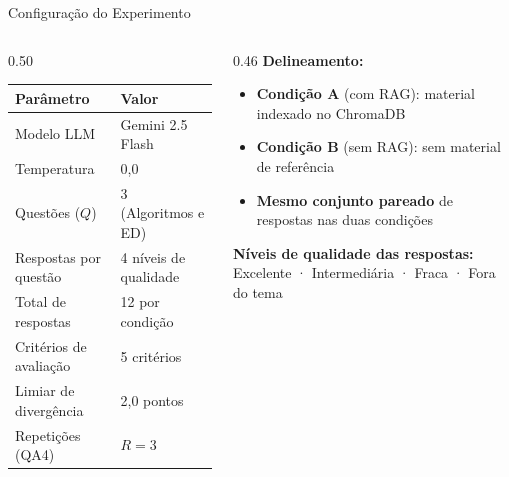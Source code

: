 \documentclass[10pt,aspectratio=169]{beamer}
\begin{document}
\begin{frame}{Configuração do Experimento}
  \begin{columns}[T]
    \begin{column}{0.50\textwidth}
      \begin{tabular}{ll}
        \toprule
        \textbf{Parâmetro} & \textbf{Valor} \\
        \midrule
        Modelo LLM & Gemini 2.5 Flash \\
        Temperatura & 0,0 \\
        Questões ($Q$) & 3 (Algoritmos e ED) \\
        Respostas por questão & 4 níveis de qualidade \\
        Total de respostas & 12 por condição \\
        Critérios de avaliação & 5 critérios \\
        Limiar de divergência & 2,0 pontos \\
        Repetições (QA4) & $R = 3$ \\
        \bottomrule
      \end{tabular}
    \end{column}
    \begin{column}{0.46\textwidth}
      \textbf{Delineamento:}
      \begin{itemize}
        \item \textbf{Condição A} (com RAG): material indexado no ChromaDB
        \item \textbf{Condição B} (sem RAG): sem material de referência
        \item \textbf{Mesmo conjunto pareado} de respostas nas duas condições
      \end{itemize}
      \vspace{0.4em}
      \textbf{Níveis de qualidade das respostas:}\\
      Excelente · Intermediária · Fraca · Fora do tema
    \end{column}
  \end{columns}
\end{frame}
\end{document}
